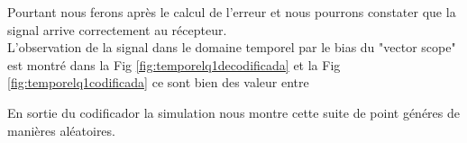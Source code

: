 \documentclass{report}
\begin{document}
Pourtant nous ferons après le calcul de l'erreur et nous pourrons constater que la signal arrive correctement au récepteur.\\
L'observation de la signal dans le domaine temporel par le bias du "vector scope" est montré dans la Fig \ref{fig:temporelq1decodificada} et la Fig \ref{fig:temporelq1codificada} ce sont bien des valeur entre 



 En sortie du codificador la simulation nous montre cette suite de point généres de manières aléatoires.
 
%
\end{document}
